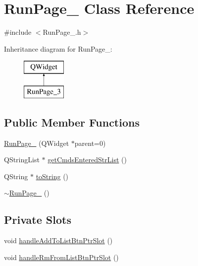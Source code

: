 \hypertarget{class_run_page__3}{\section{Run\-Page\-\_ Class Reference}
\label{class_run_page__3}
}


{\ttfamily \#include $<$Run\-Page\-\_.\-h$>$}

Inheritance diagram for Run\-Page\-\_\-:\begin{figure}[H]
\begin{center}
\leavevmode
\includegraphics[height=2.000000cm]{class_run_page__3}
\end{center}
\end{figure}
\subsection*{Public Member Functions}
\begin{DoxyCompactItemize}
\item 
\hyperlink{class_run_page__3_a3713a0f3b2200cfea30a6abc64d1c33a}{Run\-Page\-\_} (Q\-Widget $\ast$parent=0)
\item 
Q\-String\-List $\ast$ \hyperlink{class_run_page__3_abf2d4b96a9af6cb018c481e6ac6602e7}{get\-Cmds\-Entered\-Str\-List} ()
\item 
Q\-String $\ast$ \hyperlink{class_run_page__3_a639589290f9b901e395cf336a718b4ca}{to\-String} ()
\item 
\hyperlink{class_run_page__3_a248659036056bb52fa0ed53baa84e319}{$\sim$\-Run\-Page\-\_} ()
\end{DoxyCompactItemize}
\subsection*{Private Slots}
\begin{DoxyCompactItemize}
\item 
void \hyperlink{class_run_page__3_aaf2f55fb8ae135ca91f32c349cfe60fd}{handle\-Add\-To\-List\-Btn\-Ptr\-Slot} ()
\item 
void \hyperlink{class_run_page__3_a799b0eb80b946bc61aa676d199a60f30}{handle\-Rm\-From\-List\-Btn\-Ptr\-Slot} ()
\end{DoxyCompactItemize}
